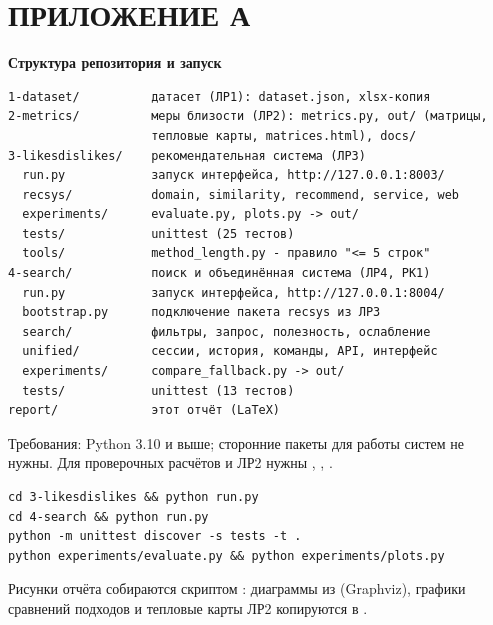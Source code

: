 \chapter*{ПРИЛОЖЕНИЕ А}

\noindent\textbf{Структура репозитория и запуск}

{\footnotesize\begin{verbatim}
1-dataset/          датасет (ЛР1): dataset.json, xlsx-копия
2-metrics/          меры близости (ЛР2): metrics.py, out/ (матрицы,
                    тепловые карты, matrices.html), docs/
3-likesdislikes/    рекомендательная система (ЛР3)
  run.py            запуск интерфейса, http://127.0.0.1:8003/
  recsys/           domain, similarity, recommend, service, web
  experiments/      evaluate.py, plots.py -> out/
  tests/            unittest (25 тестов)
  tools/            method_length.py - правило "<= 5 строк"
4-search/           поиск и объединённая система (ЛР4, РК1)
  run.py            запуск интерфейса, http://127.0.0.1:8004/
  bootstrap.py      подключение пакета recsys из ЛР3
  search/           фильтры, запрос, полезность, ослабление
  unified/          сессии, история, команды, API, интерфейс
  experiments/      compare_fallback.py -> out/
  tests/            unittest (13 тестов)
report/             этот отчёт (LaTeX)
\end{verbatim}}

\noindent Требования: Python 3.10 и выше; сторонние пакеты для работы систем не нужны. Для проверочных расчётов и ЛР2 нужны , , .

{\footnotesize\begin{verbatim}
cd 3-likesdislikes && python run.py
cd 4-search && python run.py
python -m unittest discover -s tests -t .
python experiments/evaluate.py && python experiments/plots.py
\end{verbatim}}

\noindent Рисунки отчёта собираются скриптом : диаграммы из  (Graphviz), графики сравнений подходов и тепловые карты ЛР2 копируются в .
